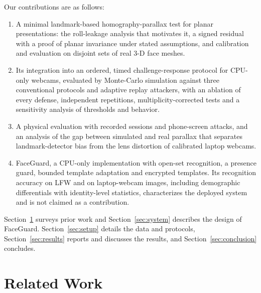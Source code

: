 \documentclass[journal]{IEEEtran}
\newcommand{\sys}{FaceGuard}
\begin{document}
Our contributions are as follows:
\begin{enumerate}
\item A minimal landmark-based homography-parallax test for planar presentations: the roll-leakage analysis that motivates it, a signed residual with a proof of planar invariance under stated assumptions, and calibration and evaluation on disjoint sets of real 3-D face meshes.
\item Its integration into an ordered, timed challenge-response protocol for CPU-only webcams, evaluated by Monte-Carlo simulation against three conventional protocols and adaptive replay attackers, with an ablation of every defense, independent repetitions, multiplicity-corrected tests and a sensitivity analysis of thresholds and behavior.
\item A physical evaluation with \rwAllSessions{} recorded sessions and \rwAllAttN{} phone-screen attacks, and an analysis of the gap between simulated and real parallax that separates landmark-detector bias from the lens distortion of \pdCams{} calibrated laptop webcams.
\item \sys{}, a CPU-only implementation with open-set recognition, a presence guard, bounded template adaptation and encrypted templates. Its recognition accuracy on LFW and on laptop-webcam images, including demographic differentials with identity-level statistics, characterizes the deployed system and is not claimed as a contribution.
\end{enumerate}
Section~\ref{sec:related} surveys prior work and Section~\ref{sec:system} describes the design of \sys{}. Section~\ref{sec:setup} details the data and protocols, Section~\ref{sec:results} reports and discusses the results, and Section~\ref{sec:conclusion} concludes.

\section{Related Work}\label{sec:related}
\end{document}
